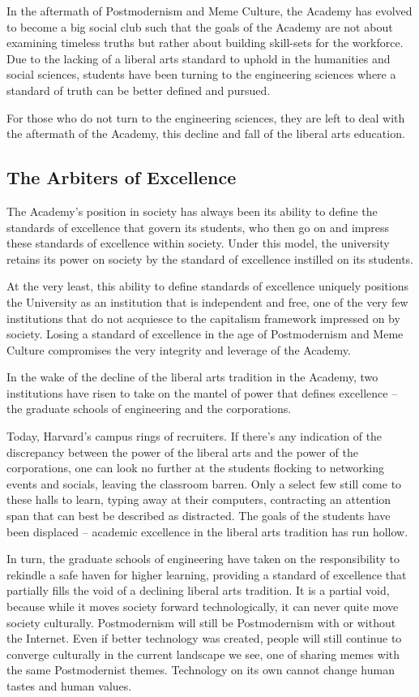 \documentclass[12pt,letterpaper]{article}
\begin{document}
In the aftermath of Postmodernism and Meme Culture, the Academy has evolved to become a big social club such that the goals of the Academy are not about examining timeless truths but rather about building skill-sets for the workforce.  Due to the lacking of a liberal arts standard to uphold in the humanities and social sciences, students have been turning to the engineering sciences where a standard of truth can be better defined and pursued.  

For those who do not turn to the engineering sciences, they are left to deal with the aftermath of the Academy, this decline and fall of the liberal arts education.   

\subsection{The Arbiters of Excellence}
The Academy's position in society has always been its ability to define the standards of excellence that govern its students, who then go on and impress these standards of excellence within society.  Under this model, the university retains its power on society by the standard of excellence instilled on its students. 

At the very least, this ability to define standards of excellence uniquely positions the University as an institution that is independent and free, one of the very few institutions that do not acquiesce to the capitalism framework impressed on by society.  Losing a standard of excellence in the age of Postmodernism and Meme Culture compromises the very integrity and leverage of the Academy.

In the wake of the decline of the liberal arts tradition in the Academy, two institutions have risen to take on the mantel of power that defines excellence -- the graduate schools of engineering and the corporations.

Today, Harvard's campus rings of recruiters.  If there's any indication of the discrepancy between the power of the liberal arts and the power of the corporations, one can look no further at the students flocking to networking events and socials, leaving the classroom barren.  Only a select few still come to these halls to learn, typing away at their computers,  contracting an attention span that can best be described as distracted.  The goals of the students have been displaced -- academic excellence in the liberal arts tradition has run hollow.

In turn, the graduate schools of engineering have taken on the responsibility to rekindle a safe haven for higher learning, providing a standard of excellence that partially fills the void of a declining liberal arts tradition.  It is a partial void, because while it moves society forward technologically, it can never quite move society culturally.  Postmodernism will still be Postmodernism  with or without the Internet.  Even if better technology was created, people will still continue to converge culturally in the current landscape we see, one of sharing memes with the same Postmodernist themes.  Technology on its own cannot change human tastes and human values.
\end{document}
